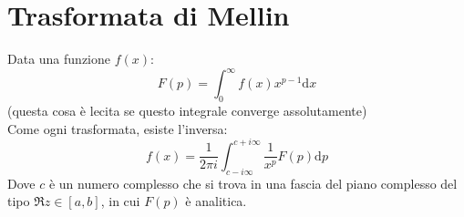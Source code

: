 \documentclass[a4paper,12pt]{article}
\theoremstyle{plain}
\theoremstyle{definition}
\newcommand{\f}[2]{\frac{#1}{#2}}
\renewcommand{\d}{\text{d}}
\theoremstyle{remark}
\begin{document}
\section{Trasformata di Mellin}\label{Mellin}
Data una funzione $f(x)$:
\[F(p)=\int_{0}^{\infty}	f(x)x^{p-1}\d x	\]
(questa cosa è lecita se questo integrale converge assolutamente)\\Come ogni trasformata, esiste l'inversa:
\[f(x)=\f{1}{2\pi i}\int_{c-i\infty}^{c+i\infty} \f{1}{x^p}F(p)	\d p		\]
Dove $c$ è un numero complesso che si trova in una fascia del piano complesso del tipo $\Re{z}\in[a,b]$, in cui $F(p)$ è analitica.
\end{document}
